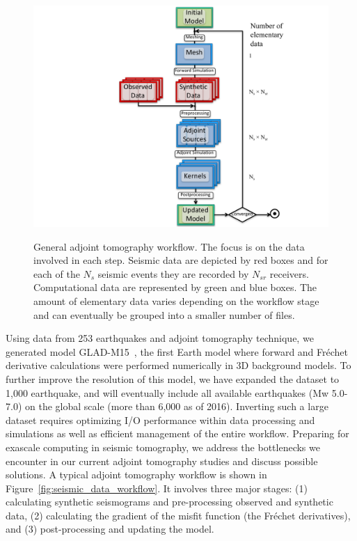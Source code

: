 \begin{figure}[htb]
  \begin{center}
  \includegraphics[width=\columnwidth]{ch-workflow/figures/seismic_data_workflow.pdf}
  \caption[General adjoint tomography workflow]
    {General adjoint tomography workflow. The focus is on the data
involved in each step. Seismic data are depicted by red boxes and for each of
the $N_{s}$ seismic events they are recorded by $N_{sr}$ receivers.
Computational data are represented by green and blue boxes. The amount of
elementary data varies depending on the workflow stage and can eventually be
grouped into a smaller number of files.}
  \label{fig:seismic_data_workflow}
  \label{default}
  \end{center}
\end{figure}
%

Using data from 253 earthquakes and adjoint tomography technique, we generated model
GLAD-M15~\cite{bozdaug2016global}, the first Earth model where forward and Fr\'echet
derivative calculations were performed numerically in 3D background models.  To
further improve the resolution of this model, we have expanded the dataset to
1,000 earthquake, and will eventually include all available earthquakes (Mw
5.0-7.0) on the global scale (more than 6,000 as of 2016). Inverting 
such a large dataset requires optimizing I/O
performance within data processing and simulations as well as efficient management
of the entire workflow. Preparing for exascale computing in seismic
tomography, we address the bottlenecks we encounter in our current adjoint
tomography studies and discuss possible solutions. A
typical adjoint tomography workflow is shown in
Figure~\ref{fig:seismic_data_workflow}.
It involves three major
stages: (1) calculating synthetic seismograms and pre-processing observed and synthetic data, 
(2) calculating the gradient of the misfit function
(the Fr\'echet derivatives), and (3) post-processing and updating the model.

